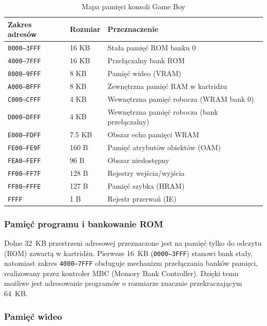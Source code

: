 \documentclass{article}
\begin{document}
\begin{table}[h]
	\centering
	\begin{tabular}{lll}
		\hline
		Zakres adresów & Rozmiar & Przeznaczenie \\
		\hline
		\texttt{0000--3FFF} & 16 KB & Stała pamięć ROM banku 0 \\
		\texttt{4000--7FFF} & 16 KB & Przełączalny bank ROM \\
		\texttt{8000--9FFF} & 8 KB  & Pamięć wideo (VRAM) \\
		\texttt{A000--BFFF} & 8 KB  & Zewnętrzna pamięć RAM w kartridżu \\
		\texttt{C000--CFFF} & 4 KB  & Wewnętrzna pamięć robocza (WRAM bank 0) \\
		\texttt{D000--DFFF} & 4 KB  & Wewnętrzna pamięć robocza (bank przełączalny) \\
		\texttt{E000--FDFF} & 7.5 KB & Obszar echo pamięci WRAM \\
		\texttt{FE00--FE9F} & 160 B & Pamięć atrybutów obiektów (OAM) \\
		\texttt{FEA0--FEFF} & 96 B  & Obszar niedostępny \\
		\texttt{FF00--FF7F} & 128 B & Rejestry wejścia/wyjścia \\
		\texttt{FF80--FFFE} & 127 B & Pamięć szybka (HRAM) \\
		\texttt{FFFF}       & 1 B   & Rejestr przerwań (IE) \\
		\hline
	\end{tabular}
	\caption{Mapa pamięci konsoli Game Boy \cite{pandocs}}
	\label{tab:gb_memory_map}
\end{table}

\subsubsection{Pamięć programu i bankowanie ROM}

Dolne 32~KB przestrzeni adresowej przeznaczone jest na pamięć tylko do odczytu (ROM) zawartą w kartridżu. Pierwsze 16~KB (\texttt{0000--3FFF}) stanowi bank stały, natomiast zakres \texttt{4000--7FFF} obsługuje mechanizm przełączania banków pamięci, realizowany przez kontroler MBC (Memory Bank Controller). Dzięki temu możliwe jest adresowanie programów o rozmiarze znacznie przekraczającym 64~KB.

\subsubsection{Pamięć wideo}
\end{document}
